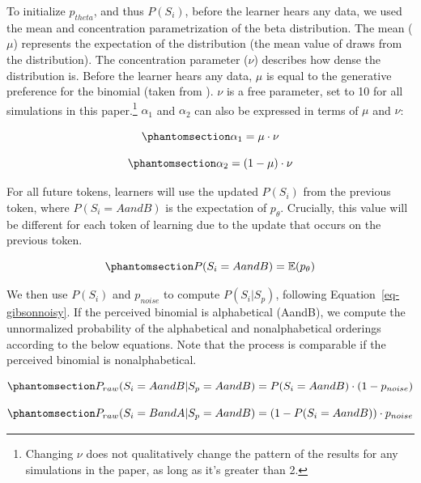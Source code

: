 \documentclass[
  12pt,
  letterpaper,
]{scrreport}
\begin{document}
To initialize \(p_{theta}\), and thus \(P(S_i)\), before the learner
hears any data, we used the mean and concentration parametrization of
the beta distribution. The mean (\(\mu\)) represents the expectation of
the distribution (the mean value of draws from the distribution). The
concentration parameter (\(\nu\)) describes how dense the distribution
is. Before the learner hears any data, \(\mu\) is equal to the
generative preference for the binomial (taken from
). \(\nu\) is a free parameter, set to 10 for all
simulations in this paper.\footnote{Changing \(\nu\) does not
  qualitatively change the pattern of the results for any simulations in
  the paper, as long as it's greater than 2.} \(\alpha_1\) and
\(\alpha_2\) can also be expressed in terms of \(\mu\) and \(\nu\):

\begin{equation}\phantomsection\label{eq-alpha1}{
\alpha_1 = \mu \cdot \nu
}\end{equation}

\begin{equation}\phantomsection\label{eq-alpha2}{
\alpha_2 = (1-\mu) \cdot \nu
}\end{equation}

For all future tokens, learners will use the updated \(P(S_i)\) from the
previous token, where \(P(S_i = AandB)\) is the expectation of
\(p_\theta\). Crucially, this value will be different for each token of
learning due to the update that occurs on the previous token.

\begin{equation}\phantomsection\label{eq-expectationptheta}{
P(S_i = AandB) = \mathbb{E}(p_\theta)
}\end{equation}

We then use \(P(S_i)\) and \(p_{noise}\) to compute \(P(S_i|S_p)\),
following Equation~\ref{eq-gibsonnoisy}. If the perceived binomial is
alphabetical (AandB), we compute the unnormalized probability of the
alphabetical and nonalphabetical orderings according to the below
equations. Note that the process is comparable if the perceived binomial
is nonalphabetical.

\begin{equation}\phantomsection\label{eq-praw}{
P_{raw}(S_i = AandB|S_p = AandB) = P(S_i = AandB) \cdot (1 -  p_{noise})
}\end{equation}

\begin{equation}\phantomsection\label{eq-praw2}{
P_{raw}(S_i = BandA|S_p = AandB) = (1 - P(S_i = AandB)) \cdot p_{noise}
}\end{equation}
\end{document}
